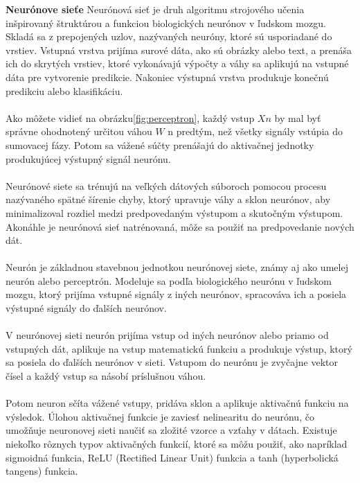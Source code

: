     \textbf{Neurónove sieťe}
    Neurónová sieť je druh algoritmu strojového učenia inšpirovaný štruktúrou a funkciou biologických neurónov v ľudskom mozgu.
    Skladá sa z prepojených uzlov, nazývaných neuróny, ktoré sú usporiadané do vrstiev. Vstupná vrstva prijíma surové dáta, ako sú obrázky alebo
    text, a prenáša ich do skrytých vrstiev, ktoré vykonávajú výpočty a váhy sa aplikujú na vstupné dáta pre vytvorenie predikcie.
    Nakoniec výstupná vrstva produkuje konečnú predikciu alebo klasifikáciu.\\
    \\
    Ako môžete vidieť na obrázku\ref{fig:perceptron}, každý vstup $Xn$ by mal byť správne ohodnotený určitou váhou $W$ n predtým,
    než všetky signály vstúpia do sumovacej fázy. Potom sa vážené súčty prenášajú do aktivačnej jednotky produkujúcej výstupný signál neurónu.\\
    \\
    Neurónové siete sa trénujú na veľkých dátových súboroch pomocou procesu nazývaného spätné šírenie chyby, ktorý upravuje váhy a sklon neurónov,
    aby minimalizoval rozdiel medzi predpovedaným výstupom a skutočným výstupom. Akonáhle je neurónová sieť natrénovaná, môže sa použiť na predpovedanie
    nových dát.\\
    \\
    Neurón je základnou stavebnou jednotkou neurónovej siete, známy aj ako umelej neurón alebo perceptrón. Modeluje sa podľa biologického
    neurónu v ľudskom mozgu, ktorý prijíma vstupné signály z iných neurónov, spracováva ich a posiela výstupné signály do ďalších neurónov.\\
    \\
    V neurónovej sieti neurón prijíma vstup od iných neurónov alebo priamo od vstupných dát, aplikuje na vstup matematickú funkciu a produkuje
    výstup, ktorý sa posiela do ďalších neurónov v sieti. Vstupom do neurónu je zvyčajne vektor čísel a každý vstup sa násobí príslušnou váhou.\\
    \\
    Potom neuron sčíta vážené vstupy, pridáva sklon a aplikuje aktivačnú funkciu na výsledok. Úlohou aktivačnej funkcie je zaviesť nelinearitu do
    neurónu, čo umožňuje neuronovej sieti naučiť sa zložité vzorce a vzťahy v dátach. Existuje niekoľko rôznych typov aktivačných funkcií, ktoré
    sa môžu použiť, ako napríklad sigmoidná funkcia, ReLU (Rectified Linear Unit) funkcia a tanh (hyperbolická tangens) funkcia.\\
    \\
